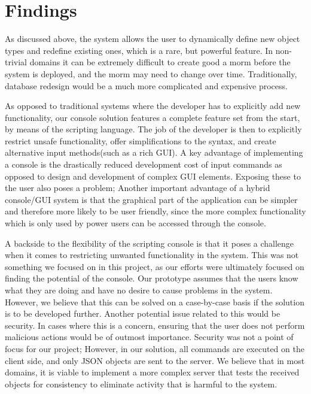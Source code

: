 \section{Findings}
As discussed above, the system allows the user to dynamically define new object types and redefine existing ones, which is a rare, but powerful feature. In non-trivial domains it can be extremely difficult to create good a morm before the system is deployed, and the morm may need to change over time. Traditionally, database redesign would be a much more complicated and expensive process.
\cite{kroenke2006database}

As opposed to traditional systems where the developer has to explicitly add new functionality, our console solution features a complete feature set from the start, by means of the scripting language. The job of the developer is then to explicitly restrict unsafe functionality, offer simplifications to the syntax, and create alternative input methods(such as a rich GUI). A key advantage of implementing a console is the drastically reduced development cost of input commands as opposed to design and development of complex GUI elements. Exposing these to the user also poses a problem; Another important advantage of a hybrid console/GUI system is that the graphical part of the application can be simpler and therefore more likely to be user friendly, since the more complex functionality which is only used by power users can be accessed through the console.

A backside to the flexibility of the scripting console is that it poses a challenge when it comes to restricting unwanted functionality in the system. This was not something we focused on in this project, as our efforts were ultimately focused on finding the potential of the console. Our prototype assumes that the users know what they are doing and have no desire to cause problems in the system. However, we believe that this can be solved on a case-by-case basis if the solution is to be developed further. Another potential issue related to this would be security. In cases where this is a concern, ensuring that the user does not perform malicious actions would be of outmost importance. Security was not a point of focus for our project; However, in our solution, all commands are executed on the client side, and only JSON objects are sent to the server. We believe that in most domains, it is viable to implement a more complex server that tests the received objects for consistency to eliminate activity that is harmful to the system.

